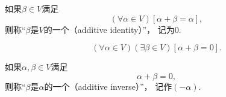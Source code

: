\begin{definition}
\begin{itemize}
\begin{axiom}[零元的存在性]
			如果\(\beta \in V\)满足\begin{equation*}
				(\forall \alpha \in V)
				[
					\alpha + \beta = \alpha
				],
			\end{equation*}
			则称“\(\beta\)是\(V\)的一个（additive identity）”，
			记为\(0\).
		\end{axiom}
		\begin{axiom}[负元的存在性]\label{definition:线性空间.运算法则4}
			\begin{equation*}
				(\forall \alpha \in V)
				(\exists \beta \in V)
				[
					\alpha + \beta = 0
				].
			\end{equation*}

			如果\(\alpha,\beta \in V\)满足\begin{equation*}
				\alpha + \beta = 0,
			\end{equation*}
			则称“\(\beta\)是\(\alpha\)的一个（additive inverse）”，
			记作\((-\alpha)\).


\end{axiom}
\end{itemize}
\end{definition}
